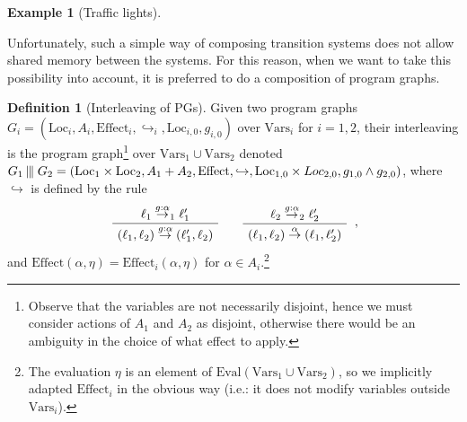 \documentclass{tufte-handout} %
\theoremstyle{definition}
\newtheorem{defn}[thm]{Definition}
\newtheorem{exmp}[thm]{Example}
\theoremstyle{remark}
\newcommand{\0}{\textsf{0}}
\newcommand{\1}{\textsf{1}}
\newcommand{\Loc}{\text{Loc}}
\newcommand{\Eval}{\text{Eval}}
\newcommand{\Eff}{\text{Effect}}
\newcommand{\Vars}{\text{Vars}}
\newcommand{\tmid}{\kern-0.20ex\mid\kern-0.20ex\mid\kern-0.20ex \mid}
\newcommand{\action}[1]{\stackrel{#1}{\rightarrow}}
\newenvironment{bprooftree}
{\leavevmode\hbox\bgroup}
{\DisplayProof\egroup}
\begin{document}
\begin{exmp}[Traffic lights]
\end{exmp}

Unfortunately, such a simple way of composing transition systems does not allow shared memory between the systems. For this reason, when we want to take this possibility into account, it is preferred to do a composition of program graphs. 

\begin{defn}[Interleaving of PGs]
	Given two program graphs $G_i = (\Loc_i, A_i, \Eff_i, \hookrightarrow_i, \Loc_{i,0}, g_{i,0})$ over $\Vars_i$ for $i=1,2$, their interleaving is the program graph\footnote{Observe that the variables are not necessarily disjoint, hence we must consider actions of $A_1$ and $A_2$ as disjoint, otherwise there would be an ambiguity in the choice of what effect to apply.} over $\Vars_1 \cup \Vars_2$ denoted $G_1 \tmid G_2 = (\Loc_1 \times \Loc_2, A_1 + A_2, \Eff, \hookrightarrow, \Loc_{1,0} \times Loc_{2,0}, g_{1,0} \wedge g_{2,0})$, where $\hookrightarrow$ is defined by the rule 
	\[\begin{bprooftree}
	\AxiomC{$\ell_1 \action{g:\alpha}_1 \ell_1'$}
	\RightLabel{}
	\UnaryInfC{$(\ell_1, \ell_2)\action{g:\alpha}(\ell_1', \ell_2)$}
	\end{bprooftree} \quad \begin{bprooftree}
	\AxiomC{$\ell_2 \action{g:\alpha}_2 \ell_2'$}
	\RightLabel{}
	\UnaryInfC{$(\ell_1, \ell_2)\action{\alpha}(\ell_1, \ell_2')$}
	\end{bprooftree},\]
	and 
	$\Eff(\alpha, \eta) = \Eff_i(\alpha ,\eta)$ for $\alpha \in A_i$.\footnote{The evaluation $\eta$ is an element of $\Eval(\Vars_1 \cup \Vars_2)$, so we implicitly adapted $\Eff_i$ in the obvious way (i.e.: it does not modify variables outside $\Vars_i$).}
\end{defn}
\end{document}
